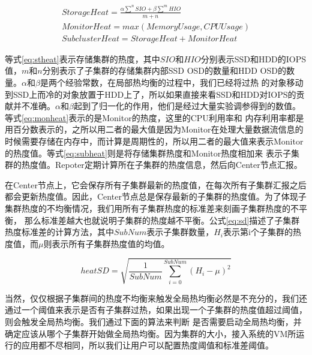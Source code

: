 \begin{eqnarray}
    \displaystyle  StorageHeat = \frac{\alpha \sum^n SIO + \beta \sum^m HIO}{m+n} \label{eq:stheat}\\
    \displaystyle  MonitorHeat = max(MemoryUsage, CPUUsage) \label{eq:monheat}  \\
    \displaystyle  SubclusterHeat = StorageHeat + MonitorHeat
    \label{eq:subheat}
    \end{eqnarray}

等式\ref{eq:stheat}表示存储集群的热度，其中$SIO$和$HIO$分别表示SSD和HDD的IOPS值，$m$和$n$分别表示了子集群的存储集群内部SSD OSD的数量和HDD OSD的数量。$\alpha$和$\beta$是两个经验常数，在局部热均衡的过程中，我们已经将过热
的对象移动到SSD上而冷的对象放置于HDD上了，所以如果直接来看SSD和HDD对IOPS的贡献并不准确。$\alpha$和$\beta$起到了归一化的作用，他们是经过大量实验调参得到的数值。等式\ref{eq:monheat}表示的是Monitor的热度，这里的CPU利用率和
内存利用率都是用百分数表示的，之所以用二者的最大值是因为Monitor在处理大量数据流信息的时候需要存储在内存中，而计算是周期性的，所以用二者的最大值来表示Monitor的热度值。等式\ref{eq:subheat}则是将存储集群热度和Monitor热度相加来
表示子集群的热度值。Repoter定期计算所在子集群的热度信息，然后向Center节点汇报。

在Center节点上，它会保存所有子集群最新的热度值，在每次所有子集群汇报之后都会更新热度值。因此，Center节点总是保存最新的子集群的热度值。为了体现子集群热度的不均衡情况，我们用所有子集群热度的标准差来刻画子集群热度的不平衡，
那么标准差越大也就说明子集群的热度越不平衡。公式\ref{eq:sd}描述了子集群热度标准差的计算方法，其中$SubNum$表示子集群数量，$H_i$表示第i个子集群的热度值，而$\mu$则表示所有子集群热度值的均值。

\begin{equation}
    \label{eq:sd}
    heatSD = \sqrt{\frac{1}{SubNum} \sum_{i=0}^{SubNum} (H_i - \mu)^2}
\end{equation}

当然，仅仅根据子集群间的热度不均衡来触发全局热均衡必然是不充分的，我们还通过一个阈值来表示是否有子集群过热，如果出现一个子集群的热度值超过阈值，则会触发全局热均衡。我们通过下面的算法来判断
是否需要启动全局热均衡，并确定应该从哪个子集群开始做全局热均衡。因为集群的大小，接入系统的VM所运行的应用都不尽相同，所以我们让用户可以配置热度阈值和标准差阈值。

